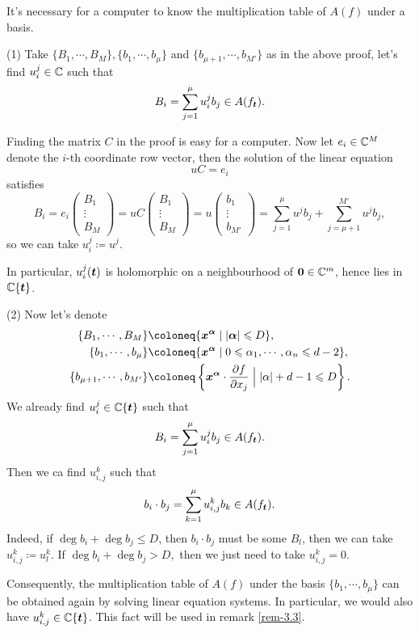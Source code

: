 \begin{remark}\label{rem-3.2}
  It's necessary for a computer to know the multiplication table of $A(f)$ under a basis.   \item[(1)] Take $\{B_1,\cdots, B_M\}, \{b_1,\cdots, b_\mu\} $  and $\{b_{\mu+1},\cdots, b_{M'}\}$ as in the above proof, let's find $u_i^j \in {\mathbb{C}}$ such that
  \[B_i = \sum_{j=1}^\mu u_i^j b_j \in A(f_{\boldsymbol t}).\]

  Finding the matrix $C$ in the proof is easy for a computer. Now let $e_i \in {\mathbb{C}}^M$ denote the $i$-th coordinate row vector, then the solution of the linear equation
  \[uC = e_i\]
  satisfies
  \[
    B_i = e_i
    \begin{pmatrix}
      B_1\\
      \vdots\\
      B_M
    \end{pmatrix}
    =
    uC
    \begin{pmatrix}
      B_1\\
      \vdots\\
      B_M
    \end{pmatrix}
    =
    u
    \begin{pmatrix}
      b_1\\
      \vdots\\
      b_{M'}
    \end{pmatrix}
    =\sum_{j=1}^\mu u^j b_j +\sum_{j=\mu+1}^{M'}u^j b_j,
  \]
  so we can take $u_i^j\coloneq u^j$.

  In particular,  $u_i^j({\boldsymbol t})$ is holomorphic on a neighbourhood of ${\boldsymbol 0}\in {\mathbb{C}}^m$, hence lies in ${\mathbb{C}}\{{\boldsymbol t}\}$.  

  \item[(2)]  Now let's denote
    \begin{align*}
      \{B_1,\cdots, B_M\}&\coloneq \{\xn^{\boldsymbol{\alpha}} \mid |\boldsymbol{\alpha}| \leqslant D \},\\
      \{b_1,\cdots, b_\mu\}&\coloneq \{\xn^{\boldsymbol {\alpha}} \mid 0 \leqslant \alpha_1,\cdots, \alpha_n \leqslant d-2\},\\
      \{b_{\mu+1},\cdots, b_{M'}\}&\coloneq \left\{ \xn^{\boldsymbol \alpha}\cdot \pd f{x_j} \Bigm| |\alpha|+d-1\leqslant D \right\}.
    \end{align*}
    We already find $u_i^j\in {\mathbb{C}}\{{\boldsymbol t}\}$ such that 
    \[B_i = \sum_{j=1}^\mu u_i^j b_j \in A(f_{\boldsymbol t}).\]
    Then we ca find  $u_{i,j}^k$ such that 
    \[b_i\cdot b_j =\sum_{k=1}^\mu u_{i,j}^k b_k \in A(f_{\boldsymbol t}).\]
    Indeed, if $\deg b_i+\deg b_j \leqslant D$, then $b_i\cdot b_j$ must be some $B_l$, then we can take $u_{i,j}^k\coloneq u_l^k.$ If $\deg b_i+\deg b_j > D,$ then we just need to take $u_{i,j}^k=0$. 

    Consequently, the multiplication table of $A(f)$ under the basis $\{b_1,\cdots, b_\mu\}$ can be obtained again by solving linear equation systems.  In particular, we would also have $u_{i,j}^k \in {\mathbb{C}}\{{\boldsymbol t}\}$. This fact will be used in remark \ref{rem-3.3}.
  \end{remark}

